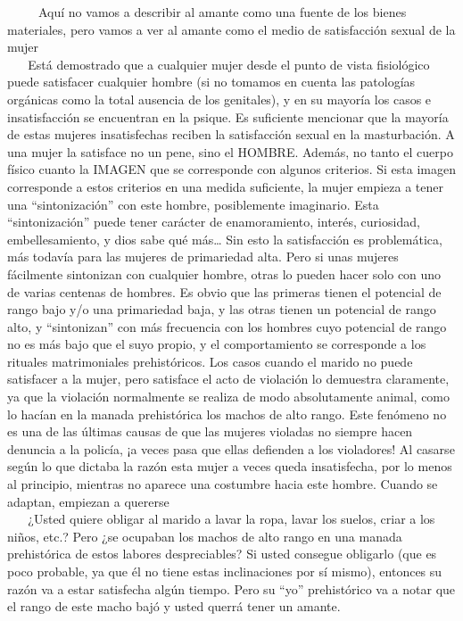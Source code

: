 ~ ~ ~ Aquí no vamos a describir al amante como una fuente de los bienes
materiales, pero vamos a ver al amante como el medio de satisfacción
sexual de la mujer\\
\hspace*{0.333em} ~ ~ Está demostrado que a cualquier mujer desde el
punto de vista fisiológico puede satisfacer cualquier hombre (si no
tomamos en cuenta las patologías orgánicas como la total ausencia de los
genitales), y en su mayoría los casos e insatisfacción se encuentran en
la psique. Es suficiente mencionar que la mayoría de estas mujeres
insatisfechas reciben la satisfacción sexual en la masturbación. A una
mujer la satisface no un pene, sino el HOMBRE. Además, no tanto el
cuerpo físico cuanto la IMAGEN que se corresponde con algunos criterios.
Si esta imagen corresponde a estos criterios en una medida suficiente,
la mujer empieza a tener una ``sintonización'' con este hombre,
posiblemente imaginario. Esta ``sintonización'' puede tener carácter de
enamoramiento, interés, curiosidad, embellesamiento, y dios sabe qué
más\ldots{} Sin esto la satisfacción es problemática, más todavía para
las mujeres de primariedad alta. Pero si unas mujeres fácilmente
sintonizan con cualquier hombre, otras lo pueden hacer solo con uno de
varias centenas de hombres. Es obvio que las primeras tienen el
potencial de rango bajo y/o una primariedad baja, y las otras tienen un
potencial de rango alto, y ``sintonizan'' con más frecuencia con los
hombres cuyo potencial de rango no es más bajo que el suyo propio, y el
comportamiento se corresponde a los rituales matrimoniales
prehistóricos. Los casos cuando el marido no puede satisfacer a la
mujer, pero satisface el acto de violación lo demuestra claramente, ya
que la violación normalmente se realiza de modo absolutamente animal,
como lo hacían en la manada prehistórica los machos de alto rango. Este
fenómeno no es una de las últimas causas de que las mujeres violadas no
siempre hacen denuncia a la policía, ¡a veces pasa que ellas defienden a
los violadores! Al casarse según lo que dictaba la razón esta mujer a
veces queda insatisfecha, por lo menos al principio, mientras no aparece
una costumbre hacia este hombre. Cuando se adaptan, empiezan a
quererse\\
\hspace*{0.333em} ~ ~ ¿Usted quiere obligar al marido a lavar la ropa,
lavar los suelos, criar a los niños, etc.? Pero ¿se ocupaban los machos
de alto rango en una manada prehistórica de estos labores despreciables?
Si usted consegue obligarlo (que es poco probable, ya que él no tiene
estas inclinaciones por sí mismo), entonces su razón va a estar
satisfecha algún tiempo. Pero su ``yo'' prehistórico va a notar que el
rango de este macho bajó y usted querrá tener un amante.

